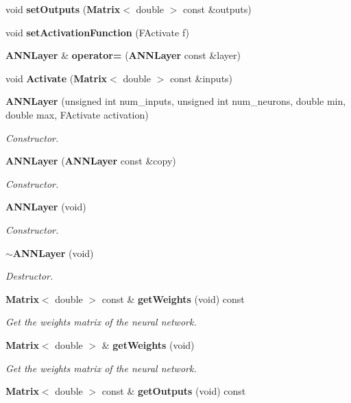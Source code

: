 \begin{DoxyCompactItemize}
\item 
void {\bfseries set\+Outputs} ({\bf Matrix}$<$ double $>$ const \&outputs)\label{class_g_a_n_n_1_1_a_n_n_layer_a7249be13922695f54aa3ed0b888584b8}

\item 
void {\bfseries set\+Activation\+Function} (F\+Activate f)\label{class_g_a_n_n_1_1_a_n_n_layer_afee60047b0ccb6d2b92f75d4b55febdc}

\item 
{\bf A\+N\+N\+Layer} \& {\bfseries operator=} ({\bf A\+N\+N\+Layer} const \&layer)\label{class_g_a_n_n_1_1_a_n_n_layer_af0143b0bacad70f0fc69969e31f60abb}

\item 
void {\bfseries Activate} ({\bf Matrix}$<$ double $>$ const \&inputs)\label{class_g_a_n_n_1_1_a_n_n_layer_aa8388e643e0916ad8366bb8abc227331}

\item 
{\bf A\+N\+N\+Layer} (unsigned int num\+\_\+inputs, unsigned int num\+\_\+neurons, double min, double max, F\+Activate activation)
\begin{DoxyCompactList}\small\item\em Constructor. \end{DoxyCompactList}\item 
{\bf A\+N\+N\+Layer} ({\bf A\+N\+N\+Layer} const \&copy)
\begin{DoxyCompactList}\small\item\em Constructor. \end{DoxyCompactList}\item 
{\bf A\+N\+N\+Layer} (void)\label{class_g_a_n_n_1_1_a_n_n_layer_a15723dede429598530fefcc7532e9ef8}

\begin{DoxyCompactList}\small\item\em Constructor. \end{DoxyCompactList}\item 
{\bf $\sim$\+A\+N\+N\+Layer} (void)\label{class_g_a_n_n_1_1_a_n_n_layer_a467acde1c266c8f32c2f47764d4e4ee0}

\begin{DoxyCompactList}\small\item\em Destructor. \end{DoxyCompactList}\item 
{\bf Matrix}$<$ double $>$ const \& {\bf get\+Weights} (void) const 
\begin{DoxyCompactList}\small\item\em Get the weights matrix of the neural network. \end{DoxyCompactList}\item 
{\bf Matrix}$<$ double $>$ \& {\bf get\+Weights} (void)
\begin{DoxyCompactList}\small\item\em Get the weights matrix of the neural network. \end{DoxyCompactList}\item 
{\bf Matrix}$<$ double $>$ const \& {\bf get\+Outputs} (void) const \label{class_g_a_n_n_1_1_a_n_n_layer_a47fbef47e9c7c0ef638aed2a2bd30974}


\end{DoxyCompactItemize}
